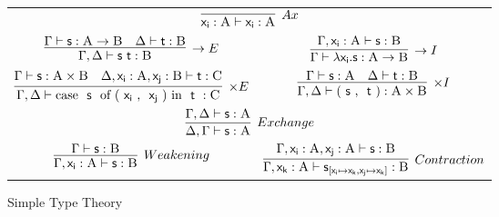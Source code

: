 \begin{figure}
	\centering
	\begin{tabularx}{0.975\textwidth}{@{}C@{~}C@{}}
		\\[1em]
		$\infer[\to E]{\Gamma, \Delta \vdash \term{s~t} : \prop B}{\Gamma \vdash \term{s} : \prop A \to \prop B & \Delta \vdash \term{t} : \prop B}$ 
		& 
		$\infer[\to I]{\Gamma \vdash \term{\lambda x_i.s} : \prop A \to \prop B}{\Gamma, \term{x_i}: \prop A \vdash \term{s}:\prop B}$\\[1em]
		$\infer[\times E]
			{\Gamma,\Delta \vdash
			 \cterm{case \term{s} of (\term{x_i}, \term{x_j}) in \term{t}} 
			 : \prop{C}}
			{\Gamma \vdash \term{s}: \prop A \times \prop B & 
			\Delta, \term{x_i}: \prop A , \term{x_j}: \prop B \vdash \term{t}: \prop{C}}$ 
		&
		$\infer[\times I]
			{\Gamma, \Delta \vdash \cterm{(\term{s}, \term{t})}: \prop{A} \times \prop{B}}
			{\Gamma \vdash \term{s}: \prop{A} & \Delta \vdash \term{t}:\prop{B}}$\\[1em]
		\\[1em]
		$\infer[Weakening]
			{\Gamma, \term{x_i}: \prop{A} \vdash \term{s}: \prop{B}}
			{\Gamma \vdash \term{s}:\prop{B}} $ 
		&
		$\infer[Contraction]
			{\Gamma, \term{x_k}: \prop{A} \vdash \term{s}_{[\term{x_i} \mapsto \term{x_k}, \term{x_j} \mapsto \term{x_k}]}:\prop{B}}
			{\Gamma,  \term{x_i}: \prop{A}, \term{x_j}: \prop{A} \vdash \term{s}: \prop{B}}$
		\end{tabularx}
	\caption{Simple Type Theory}
	\label{figure:simple_type_theory}
\end{figure}

